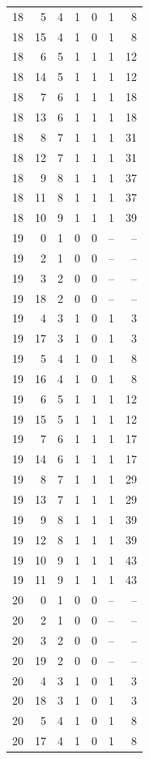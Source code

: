 \begin{longtable}{rrrrrrr}
18 & 5 & 4 & 1 & 0 & 1 & 8\\
18 & 15 & 4 & 1 & 0 & 1 & 8\\
18 & 6 & 5 & 1 & 1 & 1 & 12\\
18 & 14 & 5 & 1 & 1 & 1 & 12\\
18 & 7 & 6 & 1 & 1 & 1 & 18\\
18 & 13 & 6 & 1 & 1 & 1 & 18\\
18 & 8 & 7 & 1 & 1 & 1 & 31\\
18 & 12 & 7 & 1 & 1 & 1 & 31\\
18 & 9 & 8 & 1 & 1 & 1 & 37\\
18 & 11 & 8 & 1 & 1 & 1 & 37\\
18 & 10 & 9 & 1 & 1 & 1 & 39\\
19 & 0 & 1 & 0 & 0 & -- & --\\
19 & 2 & 1 & 0 & 0 & -- & --\\
19 & 3 & 2 & 0 & 0 & -- & --\\
19 & 18 & 2 & 0 & 0 & -- & --\\
19 & 4 & 3 & 1 & 0 & 1 & 3\\
19 & 17 & 3 & 1 & 0 & 1 & 3\\
19 & 5 & 4 & 1 & 0 & 1 & 8\\
19 & 16 & 4 & 1 & 0 & 1 & 8\\
19 & 6 & 5 & 1 & 1 & 1 & 12\\
19 & 15 & 5 & 1 & 1 & 1 & 12\\
19 & 7 & 6 & 1 & 1 & 1 & 17\\
19 & 14 & 6 & 1 & 1 & 1 & 17\\
19 & 8 & 7 & 1 & 1 & 1 & 29\\
19 & 13 & 7 & 1 & 1 & 1 & 29\\
19 & 9 & 8 & 1 & 1 & 1 & 39\\
19 & 12 & 8 & 1 & 1 & 1 & 39\\
19 & 10 & 9 & 1 & 1 & 1 & 43\\
19 & 11 & 9 & 1 & 1 & 1 & 43\\
20 & 0 & 1 & 0 & 0 & -- & --\\
20 & 2 & 1 & 0 & 0 & -- & --\\
20 & 3 & 2 & 0 & 0 & -- & --\\
20 & 19 & 2 & 0 & 0 & -- & --\\
20 & 4 & 3 & 1 & 0 & 1 & 3\\
20 & 18 & 3 & 1 & 0 & 1 & 3\\
20 & 5 & 4 & 1 & 0 & 1 & 8\\
20 & 17 & 4 & 1 & 0 & 1 & 8\\

\end{longtable}
